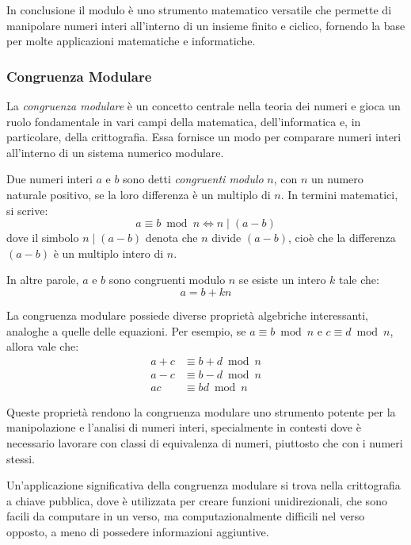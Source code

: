 \documentclass{article}
\theoremstyle{definition}
\begin{document}
In conclusione il modulo è uno strumento matematico versatile che permette di manipolare numeri interi all'interno di un insieme finito e ciclico, fornendo la base per molte applicazioni matematiche e informatiche.


\subsubsection{Congruenza Modulare}
La \emph{congruenza modulare} è un concetto centrale nella teoria dei numeri e gioca un ruolo fondamentale in vari campi della matematica, dell'informatica e, in particolare, della crittografia. Essa fornisce un modo per comparare numeri interi all'interno di un sistema numerico modulare.

Due numeri interi $a$ e $b$ sono detti \emph{congruenti modulo} $n$, con $n$ un numero naturale positivo, se la loro differenza è un multiplo di $n$. In termini matematici, si scrive:
\begin{equation*}
    a \equiv b \bmod n \Leftrightarrow n \mid (a - b)
\end{equation*}
dove il simbolo $n \mid (a - b)$ denota che $n$ divide $(a - b)$, cioè che la differenza $(a - b)$ è un multiplo intero di $n$.

In altre parole, $a$ e $b$ sono congruenti modulo $n$ se esiste un intero $k$ tale che:
\begin{equation*}
    a = b + kn
\end{equation*}

La congruenza modulare possiede diverse proprietà algebriche interessanti, analoghe a quelle delle equazioni. Per esempio, se $a \equiv b \bmod n$ e $c \equiv d \bmod n$, allora vale che:
\begin{align}
    a + c &\equiv b + d \bmod n \\
    a - c &\equiv b - d \bmod n \\
    ac &\equiv bd \bmod n
\end{align}

Queste proprietà rendono la congruenza modulare uno strumento potente per la manipolazione e l'analisi di numeri interi, specialmente in contesti dove è necessario lavorare con classi di equivalenza di numeri, piuttosto che con i numeri stessi.

Un'applicazione significativa della congruenza modulare si trova nella crittografia a chiave pubblica, dove è utilizzata per creare funzioni unidirezionali, che sono facili da computare in un verso, ma computazionalmente difficili nel verso opposto, a meno di possedere informazioni aggiuntive.
\end{document}
